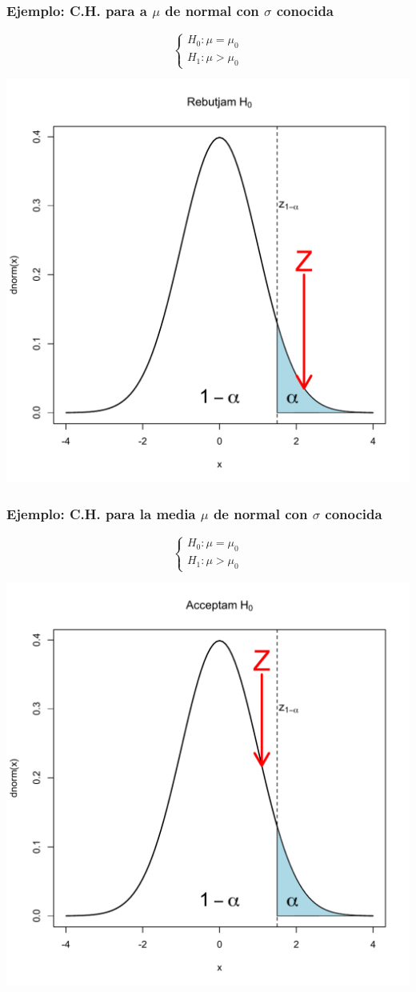\documentclass[12pt,t]{beamer}\usepackage[]{graphicx}\usepackage[]{color}
\theoremstyle{plain}
\theoremstyle{definition}
\begin{document}
\begin{frame}
\frametitle{Ejemplo: C.H. para a $\mu$ de normal con $\sigma$ conocida}
\vspace*{-0.75cm}

$$
\left\{\begin{array}{l}
H_{0}:\mu=\mu_{0}\\ H_{1}:\mu>\mu_{0}
\end{array}
\right.
$$
\begin{center}
\includegraphics[width=0.7\linewidth]{rebutjamH0z.pdf}
\end{center}

\end{frame}


\begin{frame}
\frametitle{Ejemplo: C.H. para la media $\mu$ de normal con $\sigma$ conocida}
\vspace*{-0.75cm}

$$
\left\{\begin{array}{l}
H_{0}:\mu=\mu_{0}\\ H_{1}:\mu>\mu_{0}
\end{array}
\right.
$$
\begin{center}
\includegraphics[width=0.7\linewidth]{acceptamH0z.pdf}
\end{center}

\end{frame}
\end{document}
